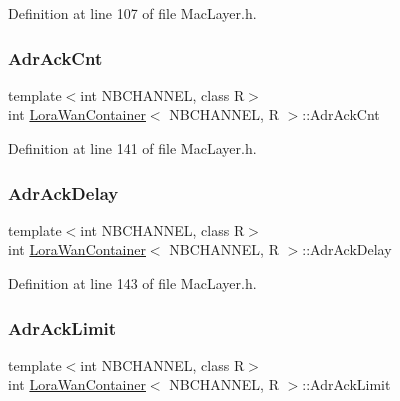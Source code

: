 Definition at line 107 of file Mac\+Layer.\+h.

\mbox{\label{class_lora_wan_container_aa92da5fb24a992b90c3bf9b1c8974643}} 
\subsubsection{\texorpdfstring{Adr\+Ack\+Cnt}{AdrAckCnt}}
{\footnotesize\ttfamily template$<$int N\+B\+C\+H\+A\+N\+N\+EL, class R$>$ \\
int \mbox{\hyperlink{class_lora_wan_container}{Lora\+Wan\+Container}}$<$ N\+B\+C\+H\+A\+N\+N\+EL, R $>$\+::Adr\+Ack\+Cnt}



Definition at line 141 of file Mac\+Layer.\+h.

\mbox{\label{class_lora_wan_container_a1106c7156c06f2f38ebb7abda72524bf}} 
\subsubsection{\texorpdfstring{Adr\+Ack\+Delay}{AdrAckDelay}}
{\footnotesize\ttfamily template$<$int N\+B\+C\+H\+A\+N\+N\+EL, class R$>$ \\
int \mbox{\hyperlink{class_lora_wan_container}{Lora\+Wan\+Container}}$<$ N\+B\+C\+H\+A\+N\+N\+EL, R $>$\+::Adr\+Ack\+Delay}



Definition at line 143 of file Mac\+Layer.\+h.

\mbox{\label{class_lora_wan_container_a89d2412d983e7027ef346f55b6b1ecf2}} 
\subsubsection{\texorpdfstring{Adr\+Ack\+Limit}{AdrAckLimit}}
{\footnotesize\ttfamily template$<$int N\+B\+C\+H\+A\+N\+N\+EL, class R$>$ \\
int \mbox{\hyperlink{class_lora_wan_container}{Lora\+Wan\+Container}}$<$ N\+B\+C\+H\+A\+N\+N\+EL, R $>$\+::Adr\+Ack\+Limit}



